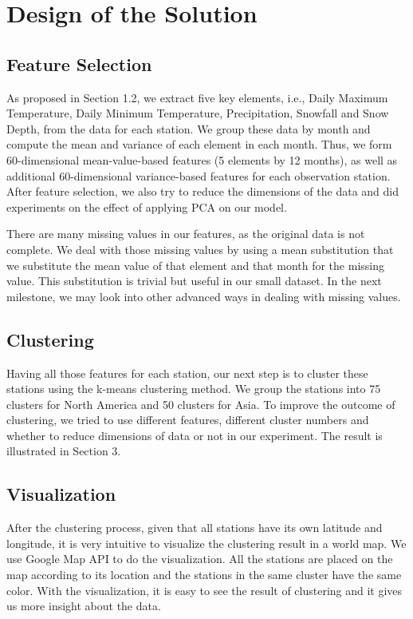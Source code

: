\section{Design of the Solution}

\subsection{Feature Selection}
As proposed in Section 1.2, we extract five key elements, i.e., Daily Maximum Temperature, Daily Minimum Temperature, Precipitation, Snowfall and Snow Depth, from the data for each station. We group these data by month and compute the mean and variance of each element in each month. Thus, we form 60-dimensional mean-value-based features (5 elements by 12 months), as well as additional 60-dimensional variance-based features for each observation station. After feature selection, we also try to reduce the dimensions of the data and did experiments on the effect of applying PCA on our model.

There are many missing values in our features, as the original data is not complete. We deal with those missing values by using a mean substitution that we substitute the mean value of that element and that month for the missing value. This substitution is trivial but useful in our small dataset. In the next milestone, we may look into other advanced ways in dealing with missing values.

\subsection{Clustering}
Having all those features for each station, our next step is to cluster these stations using the k-means clustering method. We group the stations into 75 clusters for North America and 50 clusters for Asia. To improve the outcome of clustering, we tried to use different features, different cluster numbers and whether to reduce dimensions of data or not in our experiment. The result is illustrated in Section 3. 

\subsection{Visualization}
After the clustering process, given that all stations have its own latitude and longitude, it is very intuitive to visualize the clustering result in a world map. We use Google Map API to do the visualization. All the stations are placed on the map according to its location and the stations in the same cluster have the same color. With the visualization, it is easy to see the result of clustering and it gives us more insight about the data.

